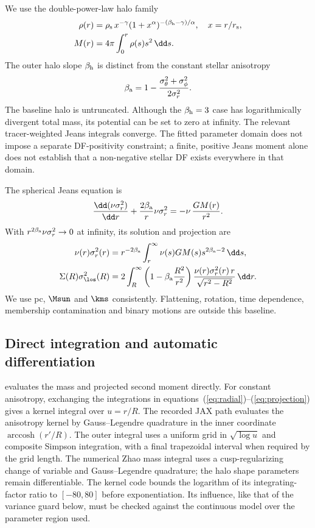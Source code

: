 We use the double-power-law halo family \citep{zhao1996}
\begin{align}
 \rho(r)&=\rho_{\rm s}\,x^{-\gamma}
             (1+x^\alpha)^{-(\beta_{\rm h}-\gamma)/\alpha},
 \quad x=r/r_{\rm s},\label{eq:halo}\\
 M(r)&=4\pi\int_0^r \rho(s)s^2\,\dd s.
\end{align}
The outer halo slope $\beta_{\rm h}$ is distinct from the constant stellar anisotropy
\begin{equation}
 \beta_{\rm a}=1-\frac{\sigma_\theta^2+\sigma_\phi^2}
                         {2\sigma_r^2}.
\end{equation}
The baseline halo is untruncated. Although the $\beta_{\rm h}=3$ case has logarithmically divergent total mass, its potential can be set to zero at infinity. The relevant tracer-weighted Jeans integrals converge. The fitted parameter domain does not impose a separate DF-positivity constraint; a finite, positive Jeans moment alone does not establish that a non-negative stellar DF exists everywhere in that domain.

The spherical Jeans equation is
\begin{equation}
 \frac{\dd(\nu\sigma_r^2)}{\dd r}
   +\frac{2\beta_{\rm a}}{r}\nu\sigma_r^2
   =-\nu\,\frac{GM(r)}{r^2}.
 \label{eq:jeans}
\end{equation}
With $r^{2\beta_{\rm a}}\nu\sigma_r^2\rightarrow0$ at infinity, its solution and projection are
\begin{align}
 \nu(r)\sigma_r^2(r)
  &=r^{-2\beta_{\rm a}}\int_r^\infty
      \nu(s)GM(s)s^{2\beta_{\rm a}-2}\,\dd s,\label{eq:radial}\\
 \Sigma(R)\sigma_{\los}^2(R)
  &=2\int_R^\infty
     \left(1-\beta_{\rm a}\frac{R^2}{r^2}\right)
     \frac{\nu(r)\sigma_r^2(r)\,r}{\sqrt{r^2-R^2}}\,\dd r .
 \label{eq:projection}
\end{align}
We use pc, $\Msun$ and $\kms$ consistently. Flattening, rotation, time dependence, membership contamination and binary motions are outside this baseline.

\subsection{Direct integration and automatic differentiation}
\label{sec:integration}
\JeansPy{} evaluates the mass and projected second moment directly. For constant anisotropy, exchanging the integrations in equations~(\ref{eq:radial})--(\ref{eq:projection}) gives a kernel integral over $u=r/R$. The recorded JAX path evaluates the anisotropy kernel by Gauss--Legendre quadrature in the inner coordinate $\operatorname{arccosh}(r'/R)$. The outer integral uses a uniform grid in $\sqrt{\log u}$ and composite Simpson integration, with a final trapezoidal interval when required by the grid length. The numerical Zhao mass integral uses a cusp-regularizing change of variable and Gauss--Legendre quadrature; the halo shape parameters remain differentiable. The kernel code bounds the logarithm of its integrating-factor ratio to $[-80,80]$ before exponentiation. Its influence, like that of the variance guard below, must be checked against the continuous model over the parameter region used.

